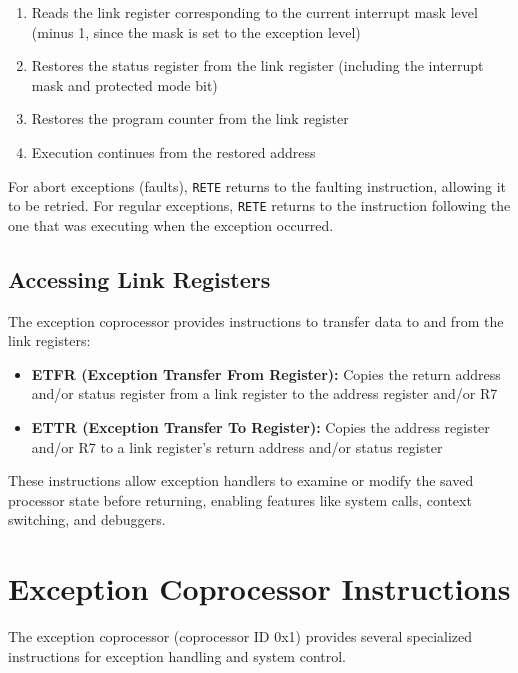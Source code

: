 \begin{enumerate}
	\item Reads the link register corresponding to the current interrupt mask level (minus 1, since the mask is set to the
	      exception level)
	\item Restores the status register from the link register (including the interrupt mask and protected mode bit)
	\item Restores the program counter from the link register
	\item Execution continues from the restored address
\end{enumerate}

For abort exceptions (faults), \texttt{RETE} returns to the faulting instruction, allowing it to be retried. For
regular exceptions, \texttt{RETE} returns to the instruction following the one that was executing when the exception
occurred.

\subsection{Accessing Link Registers}

The exception coprocessor provides instructions to transfer data to and from the link registers:

\begin{itemize}
	\item \textbf{ETFR (Exception Transfer From Register):} Copies the return address and/or status register from a link register to the address register and/or R7
	\item \textbf{ETTR (Exception Transfer To Register):} Copies the address register and/or R7 to a link register's return address and/or status register
\end{itemize}

These instructions allow exception handlers to examine or modify the saved processor state before returning, enabling
features like system calls, context switching, and debuggers.

\section{Exception Coprocessor Instructions}

The exception coprocessor (coprocessor ID 0x1) provides several specialized instructions for exception handling and
system control.

